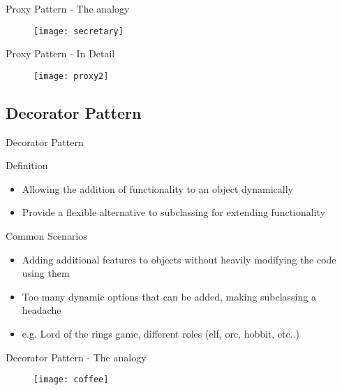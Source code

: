 \documentclass{beamer}
\begin{document}
\begin{frame}{Proxy Pattern - The analogy}
 \begin{figure}[htp]
    \centering
    \texttt{[image: secretary]}
    \label{fig:proxy}
    \end{figure}
\end{frame}

\begin{frame}{Proxy Pattern - In Detail}
    \begin{figure}[htp]
    \centering
    \texttt{[image: proxy2]}
    \label{fig:proxy2}
    \end{figure}
\end{frame}


\subsection{Decorator Pattern}
\begin{frame}{Decorator Pattern}
  \begin{block}{Definition}
   \begin{itemize}
    \item {Allowing the addition of functionality to an object dynamically}
    \item {Provide a flexible alternative to subclassing for extending functionality}
   \end{itemize}
  \end{block}
  \pause
  \begin{block}{Common Scenarios}
   \begin{itemize}
    \item { Adding additional features to objects without heavily modifying the code using them}
    \item { Too many dynamic options that can be added, making subclassing a headache }
    \item { e.g. Lord of the rings game, different roles (elf, orc, hobbit, etc..) }
   \end{itemize}
  \end{block}
\end{frame}


\begin{frame}{Decorator Pattern - The analogy}
    \begin{figure}[htp]
    \centering
    \texttt{[image: coffee]}
    \label{fig:decorator}
    \end{figure}
\end{frame}
\end{document}
